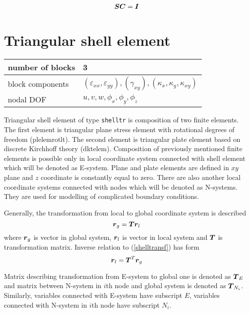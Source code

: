 \begin{eqnarray}
\mbox{\boldmath$S$} \mbox{\boldmath$C$} = \mbox{\boldmath$I$}
\end{eqnarray}

\section{Triangular shell element}
\label{secttrshellelem}

\begin{tabular}{|l|l|}
\hline
number of blocks & 3
\\ \hline
block components & $(\varepsilon_{xx},\varepsilon_{yy}), (\gamma_{xy}), (\kappa_x,\kappa_y,\kappa_{xy})$
\\ \hline
nodal DOF & $u,v,w,\phi_x,\phi_y,\phi_z$
\\ \hline
\end{tabular}

Triangular shell element of type {\tt shelltr} is composition of two finite
elements. The first element is triangular plane stress element with rotational
degrees of freedom (plelemrotlt). The second element is triangular plate element
based on discrete Kirchhoff theory (dktelem).
Composition of previously mentioned finite elements is possible only in local
coordinate system connected with shell element which will be denoted as E-system.
Plane and plate elements are defined in $xy$ plane and $z$ coordinate is constantly equal to zero.
There are also another local coordinate systems connected with nodes which will be
denoted as N-systems. They are used for modelling of complicated boundary conditions.

Generally, the transformation from local to global coordinate system is described
\begin{equation}\label{shelltransf}
\mbox{\boldmath$r$}_g = \mbox{\boldmath$T$} \mbox{\boldmath$r$}_l
\end{equation}
where $\mbox{\boldmath$r$}_g$ is vector in global system, $\mbox{\boldmath$r$}_l$ is vector in local system and
$\mbox{\boldmath$T$}$ is transformation matrix. Inverse relation to (\ref{shelltransf}) has form
\begin{equation}\label{shelltransfinv}
\mbox{\boldmath$r$}_l = \mbox{\boldmath$T$}^T \mbox{\boldmath$r$}_g
\end{equation}

Matrix describing transformation from E-system to global one is denoted as $\mbox{\boldmath$T$}_E$
and matrix between N-system in $i$th node and global system is denoted as $\mbox{\boldmath$T$}_{N_i}$.
Similarly, variables connected with E-system have subscript $E$, variables connected with
N-system in $i$th node have subscript $N_i$.

